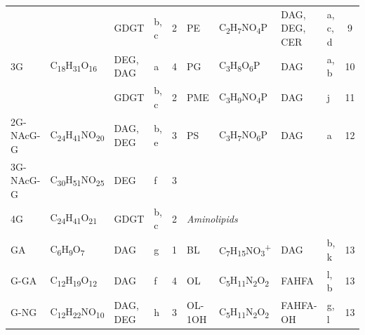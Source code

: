 {\begin{landscape}
\begin{table}
\begin{adjustbox}{width=\textheight,keepaspectratio}
\begin{threeparttable}
\begin{tabular}{lrllcrrrrr}
      &       & GDGT  & b, c  & 2     & \multicolumn{1}{l}{PE} & \multicolumn{1}{l}{C\textsubscript{2}H\textsubscript{7}NO\textsubscript{4}P} & \multicolumn{1}{l}{DAG, DEG, CER} & \multicolumn{1}{l}{a, c, d} & \multicolumn{1}{c}{9} \\
3G    & \multicolumn{1}{l}{C\textsubscript{18}H\textsubscript{31}O\textsubscript{16}} & DEG, DAG & a     & 4     & \multicolumn{1}{l}{PG} & \multicolumn{1}{l}{C\textsubscript{3}H\textsubscript{8}O\textsubscript{6}P} & \multicolumn{1}{l}{DAG} & \multicolumn{1}{l}{a, b} & \multicolumn{1}{c}{10} \\
      &       & GDGT  & b, c  & 2     & \multicolumn{1}{l}{PME} & \multicolumn{1}{l}{C\textsubscript{3}H\textsubscript{9}NO\textsubscript{4}P} & \multicolumn{1}{l}{DAG} & \multicolumn{1}{l}{j} & \multicolumn{1}{c}{11} \\
2G-NAcG-G & \multicolumn{1}{l}{C\textsubscript{24}H\textsubscript{41}NO\textsubscript{20}} & DAG, DEG & b, e  & 3     & \multicolumn{1}{l}{PS} & \multicolumn{1}{l}{C\textsubscript{3}H\textsubscript{7}NO\textsubscript{6}P} & \multicolumn{1}{l}{DAG} & \multicolumn{1}{l}{a} & \multicolumn{1}{c}{12} \\
3G-NAcG-G & \multicolumn{1}{l}{C\textsubscript{30}H\textsubscript{51}NO\textsubscript{25}} & DEG   & f     & 3     &       &       &       &       &  \\
4G    & \multicolumn{1}{l}{C\textsubscript{24}H\textsubscript{41}O\textsubscript{21}} & GDGT  & b, c  & 2     & \multicolumn{2}{l}{\textit{Aminolipids}} &       &       &  \\
GA    & \multicolumn{1}{l}{C\textsubscript{6}H\textsubscript{9}O\textsubscript{7}} & DAG   & g     & 1     & \multicolumn{1}{l}{BL} & \multicolumn{1}{l}{C\textsubscript{7}H\textsubscript{15}NO\textsubscript{3}\textsuperscript{+}} & \multicolumn{1}{l}{DAG} & \multicolumn{1}{l}{b, k\newline{}} & \multicolumn{1}{c}{13} \\
G-GA  & \multicolumn{1}{l}{C\textsubscript{12}H\textsubscript{19}O\textsubscript{12}} & DAG   & f     & 4     & \multicolumn{1}{l}{OL} & \multicolumn{1}{l}{C\textsubscript{5}H\textsubscript{11}N\textsubscript{2}O\textsubscript{2}} & \multicolumn{1}{l}{FAHFA} & \multicolumn{1}{l}{l, b} & \multicolumn{1}{c}{13} \\
G-NG  & \multicolumn{1}{l}{C\textsubscript{12}H\textsubscript{22}NO\textsubscript{10}} & DAG, DEG & h     & 3     & \multicolumn{1}{l}{OL-1OH} & \multicolumn{1}{l}{C\textsubscript{5}H\textsubscript{11}N\textsubscript{2}O\textsubscript{2}} & \multicolumn{1}{l}{FAHFA-OH} & \multicolumn{1}{l}{g, l} & \multicolumn{1}{c}{13} \\

\end{tabular}
\end{threeparttable}
\end{adjustbox}
\end{table}
\end{landscape}}
